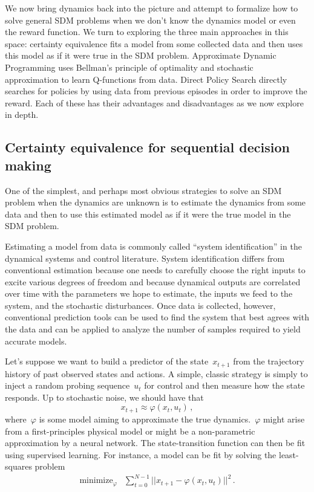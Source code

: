 \documentclass{tufte-book}
\begin{document}
We now bring dynamics back into the picture and attempt to formalize how
to solve general SDM problems when we don't know the dynamics model or
even the reward function. We turn to exploring the three main approaches
in this space: certainty equivalence fits a model from some collected
data and then uses this model as if it were true in the SDM problem.
Approximate Dynamic Programming uses Bellman's principle of optimality
and stochastic approximation to learn Q-functions from data. Direct
Policy Search directly searches for policies by using data from previous
episodes in order to improve the reward. Each of these has their
advantages and disadvantages as we now explore in depth.

\hypertarget{certainty-equivalence-for-sequential-decision-making}{%
\subsection{Certainty equivalence for sequential decision
making}\label{certainty-equivalence-for-sequential-decision-making}}

One of the simplest, and perhaps most obvious strategies to solve an SDM
problem when the dynamics are unknown is to estimate the dynamics from
some data and then to use this estimated model as if it were the true
model in the SDM problem.

Estimating a model from data is commonly called ``system
identification'' in the dynamical systems and control literature. System
identification differs from conventional estimation because one needs to
carefully choose the right inputs to excite various degrees of freedom
and because dynamical outputs are correlated over time with the
parameters we hope to estimate, the inputs we feed to the system, and
the stochastic disturbances. Once data is collected, however,
conventional prediction tools can be used to find the system that best
agrees with the data and can be applied to analyze the number of samples
required to yield accurate models.

Let's suppose we want to build a predictor of the state~\(x_{t+1}\) from
the trajectory history of past observed states and actions. A simple,
classic strategy is simply to inject a random probing sequence~\(u_t\)
for control and then measure how the state responds. Up to stochastic
noise, we should have that \[
    x_{t+1} \approx \varphi(x_t,u_t) \,,
\] where~\(\varphi\) is some model aiming to approximate the true
dynamics.~\(\varphi\) might arise from a first-principles physical model
or might be a non-parametric approximation by a neural network. The
state-transition function can then be fit using supervised learning. For
instance, a model can be fit by solving the least-squares problem \[
\begin{array}{ll}
\text{minimize}_{\varphi} & \sum_{t=0}^{N-1} ||x_{t+1} - \varphi(x_t,u_t)||^2\,.
\end{array}
\]
\end{document}

